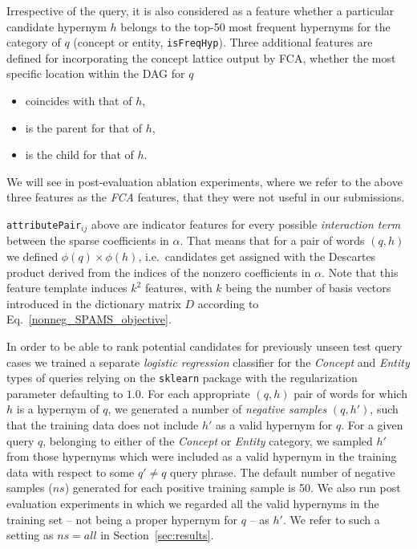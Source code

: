 \documentclass[11pt,a4paper]{article}
\begin{document}
Irrespective of the query, it is also considered as a feature whether a
particular candidate hypernym $h$ belongs to the top-50 most frequent hypernyms
for the category of $q$ (concept or entity, \texttt{isFreqHyp}).
Three additional features are defined for incorporating the concept lattice
output by FCA, whether the most specific location within the DAG for $q$
\begin{itemize}
	\item coincides with that of $h$,
	\item is the parent for that of $h$,
	\item is the child for that of $h$.
\end{itemize}
We will see in post-evaluation ablation experiments, where we refer to the
above three features as the \emph{FCA} features, that they were not useful in
our submissions.

\texttt{attributePair}$_{ij}$ above are indicator features for every possible
\emph{interaction term}
between the sparse coefficients in $\alpha$. That means that for a pair of
words $(q, h)$ we defined $\phi(q) \times \phi(h)$, i.e.~candidates
get assigned with the Descartes product derived from the indices of the nonzero
coefficients in $\alpha$. Note that this feature template induces $k^2$
features, with $k$ being the number of basis vectors introduced in the dictionary matrix $D$ according to Eq.~\ref{nonneg_SPAMS_objective}.

In order to be able to rank potential candidates for previously unseen test
query cases we trained a separate \emph{logistic regression} classifier for the 
\textit{Concept} and \textit{Entity} types of queries relying on the
\texttt{sklearn} package with the regularization parameter defaulting to $1.0$. 
For each appropriate $(q,h)$ pair of words for which
$h$ is a hypernym of $q$, we generated a number of \emph{negative samples} $(q, h')$,
such that the training data does not include $h'$ as a valid hypernym for $q$.
For a given query $q$, belonging to either of the \textit{Concept} or
\textit{Entity} category, we sampled $h'$ from those hypernyms which were
included as a valid hypernym in the training data with respect to some $q' \neq
q$ query phrase. The default number of negative samples ($ns$) generated for 
each
positive training sample is 50. We also run post evaluation experiments in 
which we regarded all the valid hypernyms in the training set -- not being a 
proper hypernym for $q$ -- as $h'$. We refer to such a setting as $ns=all$ in 
Section~\ref{sec:results}.
\end{document}
